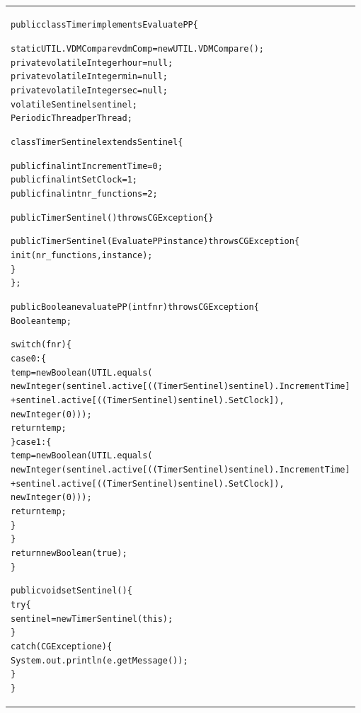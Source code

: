 \documentclass[\pformat,11pt]{jarticle}
\newlength{\negoneline}
\newcommand{\listingsize}[0]{\renewcommand{\baselinestretch}{0.95}\tt\footnotesize}
\newcommand{\startbox}[0]{
\begin{center}
\listingsize
\begin{tabular}{|p{.975\textwidth}|}\hline\vspace{\negoneline}}
\newcommand{\interruptbox}[0]{
\end{tabular}
\end{center}}
\newcommand{\scriptlistingsize}[0]{\tt\scriptsize}
\newcommand{\gbx}[1]{\colorbox{bggray}{#1}}
\begin{document}
\startbox
{\scriptlistingsize\begin{alltt}
public class Timer \gbx{implements EvaluatePP} \{

  static UTIL.VDMCompare vdmComp = new UTIL.VDMCompare();
  private \gbx{volatile} Integer hour = null;
  private \gbx{volatile} Integer min = null;
  private \gbx{volatile} Integer sec = null;
  \gbx{volatile Sentinel sentinel};
  \gbx{PeriodicThread perThread};

  \gbx{class TimerSentinel extends Sentinel \{}

    public final int IncrementTime = 0;
    public final int SetClock = 1;
    public final int nr_functions = 2;

    public TimerSentinel () throws CGException\{\}

    public TimerSentinel (EvaluatePP instance) throws CGException\{
      init(nr_functions, instance);
    \}
  \};

  \gbx{public Boolean evaluatePP (int fnr) throws CGException\{}
    Boolean temp;

    switch(fnr) \{
    case 0: \{
      temp = new Boolean(UTIL.equals(
               new Integer(sentinel.active[((TimerSentinel) sentinel).IncrementTime]
                           + sentinel.active[((TimerSentinel) sentinel).SetClock]),
               new Integer(0)));
      return temp;
    \}    case 1: \{
      temp = new Boolean(UTIL.equals(
               new Integer(sentinel.active[((TimerSentinel) sentinel).IncrementTime]
                           + sentinel.active[((TimerSentinel) sentinel).SetClock]),
               new Integer(0)));
      return temp;
    \}
    \}
    return new Boolean(true);
  \}

  \gbx{public void setSentinel () \{}
    try\{
      sentinel = new TimerSentinel(this);
    \}
    catch (CGException e) \{
      System.out.println(e.getMessage());
    \}
  \}


\end{alltt}}
\interruptbox
\end{document}
